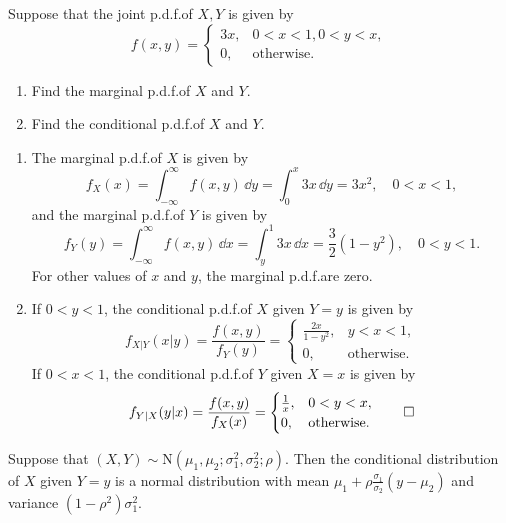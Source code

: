\begin{example}
  Suppose that the joint p.d.f.\@ of \(X, Y\) is given by
  \[
    f(x, y) = \begin{cases}
      3x, & 0 < x < 1, 0 < y < x, \\
      0, & \text{otherwise}.
    \end{cases}
  \]
  \begin{enumerate}
    \item Find the marginal p.d.f.\@ of \(X\) and \(Y\).
    \item Find the conditional p.d.f.\@ of \(X\) and \(Y\).
  \end{enumerate}
\end{example}
\begin{solution}
  \begin{enumerate}
    \item The marginal p.d.f.\@ of \(X\) is given by
    \[
      f_X(x) = \int_{-\infty}^\infty f(x, y) \, \dd y = \int_0^x 3x \, \dd y = 3x^2, \quad 0 < x < 1,
    \]
    and the marginal p.d.f.\@ of \(Y\) is given by
    \[
      f_Y(y) = \int_{-\infty}^\infty f(x, y) \, \dd x = \int_y^1 3x \, \dd x = \frac{3}{2}(1 - y^2), \quad 0 < y < 1.
    \]
    For other values of \(x\) and \(y\), the marginal p.d.f.\@s are zero.
    \item If \(0 < y < 1\), the conditional p.d.f.\@ of \(X\) given \(Y = y\) is given by
    \[
      f_{X|Y}(x | y) = \frac{f(x, y)}{f_Y(y)} = \begin{cases}
        \frac{2x}{1 - y^2}, & y < x < 1, \\
        0, & \text{otherwise}.
      \end{cases}
    \]
    If \(0 < x < 1\), the conditional p.d.f.\@ of \(Y\) given \(X = x\) is given by
    \[
      f_{Y|X}(y | x) = \frac{f(x, y)}{f_X(x)} = \begin{cases}
        \frac{1}{x}, & 0 < y < x, \\
        0, & \text{otherwise}.
      \end{cases} \qedhere
    \]
  \end{enumerate}
\end{solution}

\begin{proposition}
  Suppose that \((X, Y) \sim \mathrm{N}(\mu_1, \mu_2; \sigma_1^2, \sigma_2^2; \rho)\). Then the conditional distribution of \(X\) given \(Y = y\) is a normal distribution with mean \(\mu_1 + \rho \frac{\sigma_1}{\sigma_2} (y - \mu_2)\) and variance \((1 - \rho^2) \sigma_1^2\).
\end{proposition}

